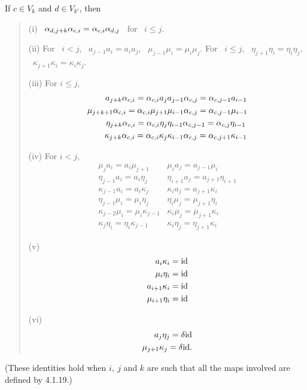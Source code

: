 \bs
{} If $c\in V_k$ and $d\in V_{k'}$, then
\begin{verse}
(i) \ $\alpha_{d,j+k}\alpha_{c,i}=\alpha_{c,i}\alpha_{d,j}$ \ for \ 
$i\leq j$.

(ii) For \ $i < j$, \ $a_{j-1}a_i=a_ia_j$,  \
 $\mu_{j-1}\mu_i=\mu_i\mu_j$. \newline
For \ $i\leq j$, \ $\eta_{j+1}\eta_i=\eta_i\eta_j$, \
$\kappa_{j+1}\kappa_i=\kappa_i\kappa_j$.

(iii) For $i\leq j$,
\begin{eqnarray*}
   a_{j+k}\alpha_{c,i}=\alpha_{c,i}a_j &
a_{j-1}\alpha_{c,j}=\alpha_{c,j-1}a_{i-1} \\
\mu_{j+k+1}\alpha_{c,i}=\alpha_{c,i}\mu_{j+1} &
\mu_{i-1}\alpha_{c,j}=\alpha_{c,j-1}\mu_{i-1} \\
\eta_{j+k}\alpha_{c,i}=\alpha_{c,i}\eta_j &
\eta_{i-1}\alpha_{c,j-1}=\alpha_{c,j}\eta_{i-1} \\
\kappa_{j+k}\alpha_{c,i}=\alpha_{c,i}\kappa_j & \kappa_{i-1}\alpha_{c,j}=\alpha_{c,j+1}
\kappa_{i-1}
\end{eqnarray*}

(iv) For $i < j$,
\begin{eqnarray*}
\mu_j a_i =a_i\mu_{j+1} & \mu_ia_j=a_{j-1}\mu_i\\
\eta_{j-1}a_i=a_i\eta_j &   \eta_{i+1}a_j=a_{j+1}\eta_{i+1}\\
\kappa_{j-1}a_i=a_i\kappa_j &  \kappa_ia_j=a_{j+1}\kappa_i\\
\eta_{j-1}\mu_i=\mu_i\eta_j &  \eta_i\mu_j=\mu_{j+1}\eta_i\\
\kappa_{j-2}\mu_i=\mu_i\kappa_{j-1} &  \kappa_i\mu_j=\mu_{j+1}\kappa_i\\
\kappa_j\eta_i =\eta_i\kappa_{j-1} &  \kappa_i\eta_j=\eta_{j+1}\kappa_i
\end{eqnarray*}

(v) 
\begin{eqnarray*}
a_i\kappa_i={\bf\rm{id}} \\
\mu_i\eta_i={\bf\rm{id}} \\
a_{i+1}\kappa_i={\bf\rm{id}} \\
\mu_{i+1}\eta_i={\bf\rm{id}} 
\end{eqnarray*}

(vi) 
\begin{eqnarray*}
a_j\eta_j=\delta{\bf\rm{id}} \\
\mu_{j+1}\kappa_j=\delta{\bf\rm{id}}.
\end{eqnarray*}
\end{verse}
(These identities hold when $i, \ j$ and $k$ are such that all the
maps involved are defined by 4.1.19.)

